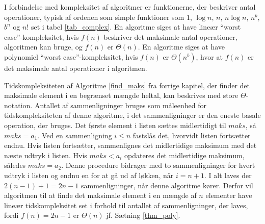 

\noindent I forbindelse med kompleksitet af algoritmer er funktionerne, der beskriver antal operationer, typisk af ordenen som simple funktioner som $1$, $\log n$, $n$, $n \log n$, $n^b$, $b^n$ og $n!$ set i tabel \ref{tab_complex}. 
En algoritme siges at have lineær “worst case”-kompleksitet, hvis $f(n)$ beskriver det maksimale antal operationer,  algoritmen kan bruge, og $f(n)$ er $\Theta(n)$. 
En algoritme siges at have polynomiel “worst case”-kompleksitet, hvis $f(n)$ er $\Theta(n^b)$, hvor at $f(n)$ er det maksimale antal operationer i algoritmen.

\begin{exmp}
Tidskompleksiteten af Algoritme \ref{find_maks} fra forrige kapitel, der finder det maksimale element i en begrænset mængde heltal, kan beskrives med store $\Theta$-notation. 
Antallet af sammenligninger bruges som måleenhed for tidskompleksiteten af denne algoritme, i det sammenligninger er den eneste basale operation, der bruges.
Det første element i listen sættes midlertidigt til $maks$, så $maks=a_1$. 
Ved en sammenligning $i \leq n$ fastslås det, hvorvidt listen fortsætter endnu. Hvis listen fortsætter, sammenlignes det midlertidige maksimum med det næste udtryk i listen. 
Hvis $maks<a_i$ opdateres det midlertidige maksimum, således $maks=a_2$.
Denne procedure bidrager med to sammenligninger for hvert udtryk i listen og endnu en for at gå ud af løkken, når $i=n+1$. 
I alt laves der $2(n-1)+1=2n-1$ sammenligninger, når denne algoritme kører. 
Derfor vil algoritmen til at finde det maksimale element i en mængde af $n$ elementer have lineær tidskompleksitet set i forhold til antallet af sammenligninger, der laves, fordi $f(n)=2n-1$ er $\Theta (n)$ jf. Sætning \ref{thm_poly}.  
\end{exmp}
